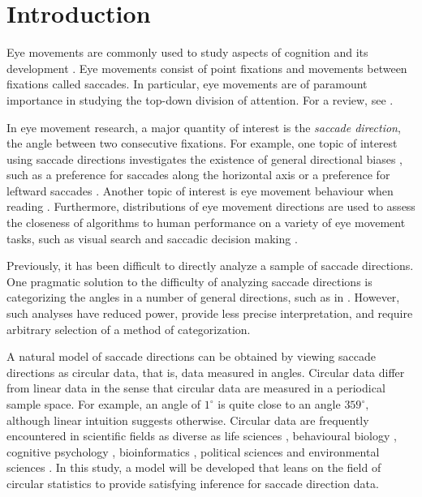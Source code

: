 \section{Introduction} \label{intro}

Eye movements are commonly used to study aspects of cognition and its development \citep{itti2001computational, henderson2003human}. Eye movements consist of point fixations and movements between fixations called saccades. In particular, eye movements are of paramount importance in studying the top-down division of attention. For a review, see \citet{rayner2009eye}.

In eye movement research, a major quantity of interest is the \textit{saccade direction}, the angle between two consecutive fixations. For example, one topic of interest using saccade directions investigates the existence of general directional biases \citep{tatler2009prominence}, such as a preference for saccades along the horizontal axis \citep{foulsham2008turning} or a preference for leftward saccades \citep{foulsham2013leftward}. Another topic of interest is eye movement behaviour when reading \citep{rayner2009eye}. Furthermore, distributions of eye movement directions are used to assess the closeness of algorithms to human performance on a variety of eye movement tasks, such as visual search \citep{najemnik2008eye} and saccadic decision making \citep{tatler2017latest, engbert2015spatial, le2016introducing}.

Previously, it has been difficult to directly analyze a sample of saccade directions. One pragmatic solution to the difficulty of analyzing saccade directions is categorizing the angles in a number of general directions, such as in \citet{foulsham2008turning}. However, such analyses have reduced power, provide less precise interpretation, and require arbitrary selection of a method of categorization.

A natural model of saccade directions can be obtained by viewing saccade directions as circular data, that is, data measured in angles. Circular data differ from linear data in the sense that circular data are measured in a periodical sample space. For example, an angle of $1^{\circ}$ is quite close to an angle $359^{\circ},$ although linear intuition suggests otherwise. Circular data are frequently encountered in scientific fields as diverse as life sciences \citep{mardianew}, behavioural biology \citep{bulbert2015danger}, cognitive psychology \citep{kaas2006haptic}, bioinformatics \citep{mardia2008multivariate}, political sciences \citep{gill2010} and environmental sciences \citep{arnold2006recent}. In this study, a model will be developed that leans on the field of circular statistics \citep{fisher1995statistical, mardia2009directional, pewsey2013circular} to provide satisfying inference for saccade direction data.

